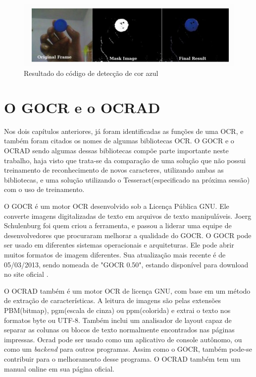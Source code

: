 \begin{figure}[htbp]
\caption{\label{fig:deteccao_cor}Resultado do código de detecção de cor azul}
\begin{center}
	\includegraphics[width=.9\textwidth]{figuras/f6c3.png}
\end{center}
\end{figure} 

\section{O GOCR e o OCRAD}

Nos dois capítulos anteriores, já foram identificadas as funções de uma OCR, e também foram citados os nomes de algumas bibliotecas OCR. O GOCR e o OCRAD sendo algumas dessas bibliotecas compõe parte importante neste trabalho, haja visto que trata-se da comparação de uma solução que não possui treinamento de reconhecimento de novos caracteres, utilizando ambas as bibliotecas, e uma solução utilizando o Tesseract(especificado na próxima sessão) com o uso de treinamento. 

O GOCR é um motor OCR desenvolvido sob a Licença Pública GNU. Ele converte imagens digitalizadas de texto em arquivos de texto manipuláveis. Joerg Schulenburg foi quem criou a ferramenta, e passou a liderar uma equipe de desenvolvedores que procuraram melhorar a qualidade do GOCR. O GOCR pode ser usado em diferentes sistemas operacionais e arquiteturas. Ele pode abrir muitos formatos de imagem diferentes. Sua atualização mais recente é de 05/03/2013, sendo nomeada de "GOCR 0.50", estando disponível para download no site oficial \cite{GOCR}.

O OCRAD também é um motor OCR de licença GNU, com base em um método de extração de características. A leitura de imagens são pelas extensões PBM(bitmap), pgm(escala de cinza) ou ppm(colorida) e extrai o texto nos formatos byte ou UTF-8. Também inclui um analisador de layout capaz de separar as colunas ou blocos de texto normalmente encontrados nas páginas impressas. Ocrad pode ser usado como um aplicativo de console autônomo, ou como um \textit{backend} para outros programas. Assim como o GOCR, também pode-se contribuir para o melhoramento desse programa\cite{OCRAD}. O OCRAD também tem um manual online em sua página oficial.

